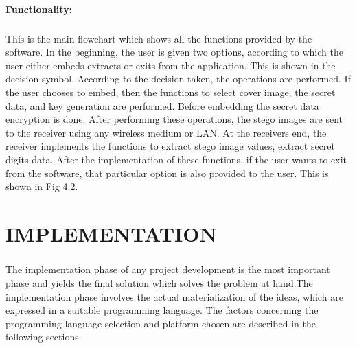 \documentclass[12pt]{report}
\begin{document}
\subsubsection{Functionality:} 
\paragraph{}This is the main flowchart which shows all the functions provided by the software. In the beginning, the user is given two options, according to which the user either embeds extracts or exits from the application. This is shown in the decision symbol. According to the decision taken, the operations are performed. If the user chooses to embed, then the functions to select cover image, the secret data, and key generation are performed. Before embedding the secret data encryption is done. After performing these operations, the stego images are sent to the receiver using any wireless medium or LAN. At the receivers end, the receiver implements the functions to extract stego image values, extract secret digits data. After the implementation of these functions, if the user wants to exit from the software, that particular option is also provided to the user. This is shown in Fig 4.2.
\pagebreak

\pagebreak
\pagebreak

\chapter{IMPLEMENTATION}
\pagestyle{fancy}
\chead{}
\rfoot{\small{\thepage}}
\renewcommand{\headrulewidth}{0.4pt}
\renewcommand{\footrulewidth}{0.4pt}
\paragraph{}The implementation phase of any project development is the most important phase and yields the final solution which solves the problem at hand.The implementation phase involves the actual materialization of the ideas, which are expressed in a suitable programming language. The factors concerning the programming language selection and platform chosen are described in the following sections.
\end{document}
